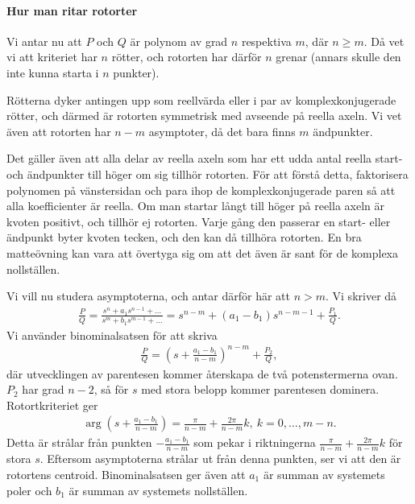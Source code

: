\paragraph{Hur man ritar rotorter}
Vi antar nu att $P$ och $Q$ är polynom av grad $n$ respektiva $m$, där $n \geq m$. Då vet vi att kriteriet har $n$ rötter, och rotorten har därför $n$ grenar (annars skulle den inte kunna starta i $n$ punkter).

Rötterna dyker antingen upp som reellvärda eller i par av komplexkonjugerade rötter, och därmed är rotorten symmetrisk med avseende på reella axeln. Vi vet även att rotorten har $n - m$ asymptoter, då det bara finns $m$ ändpunkter.

Det gäller även att alla delar av reella axeln som har ett udda antal reella start- och ändpunkter till höger om sig tillhör rotorten. För att förstå detta, faktorisera polynomen på vänstersidan och para ihop de komplexkonjugerade paren så att alla koefficienter är reella. Om man startar långt till höger på reella axeln är kvoten positivt, och tillhör ej rotorten. Varje gång den passerar en start- eller ändpunkt byter kvoten tecken, och den kan då tillhöra rotorten. En bra matteövning kan vara att övertyga sig om att det även är sant för de komplexa nollställen.

Vi vill nu studera asymptoterna, och antar därför här att $n > m$. Vi skriver då
\begin{align*}
	\frac{P}{Q} = \frac{s^{n} + a_{1}s^{n - 1} + \dots}{s^{m} + b_{1}s^{m - 1} + \dots} = s^{n - m} + (a_{1} - b_{1})s^{n  - m - 1} + \frac{P_{1}}{Q}.
\end{align*}
Vi använder binominalsatsen för att skriva
\begin{align*}
	\frac{P}{Q} = \left(s + \frac{a_{1} - b_{1}}{n - m}\right)^{n - m} + \frac{P_{2}}{Q},
\end{align*}
där utvecklingen av parentesen kommer återskapa de två potenstermerna ovan. $P_{2}$ har grad $n - 2$, så för $s$ med stora belopp kommer parentesen dominera. Rotortkriteriet ger
\begin{align*}
	\arg\left(s + \frac{a_{1} - b_{1}}{n - m}\right) = \frac{\pi}{n - m} + \frac{2\pi}{n - m}k,\ k = 0, \dots, m - n.
\end{align*}
Detta är strålar från punkten $-\frac{a_{1} - b_{1}}{n - m}$ som pekar i riktningerna $\frac{\pi}{n - m} + \frac{2\pi}{n - m}k$ för stora $s$. Eftersom asymptoterna strålar ut från denna punkten, ser vi att den är rotortens centroid. Binominalsatsen ger även att $a_{1}$ är summan av systemets poler och $b_{1}$ är summan av systemets nollställen.

